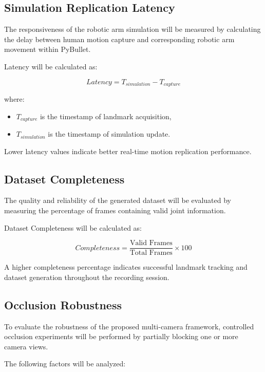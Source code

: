 \subsection{Simulation Replication Latency}

The responsiveness of the robotic arm simulation will be measured by calculating the delay between human motion capture and corresponding robotic arm movement within PyBullet.

Latency will be calculated as:

\begin{equation}
Latency = T_{simulation} - T_{capture}
\end{equation}

where:
\begin{itemize}
    \item $T_{capture}$ is the timestamp of landmark acquisition,
    \item $T_{simulation}$ is the timestamp of simulation update.
\end{itemize}

Lower latency values indicate better real-time motion replication performance.

\subsection{Dataset Completeness}

The quality and reliability of the generated dataset will be evaluated by measuring the percentage of frames containing valid joint information.

Dataset Completeness will be calculated as:

\begin{equation}
Completeness = \frac{\text{Valid Frames}}{\text{Total Frames}} \times 100
\end{equation}

A higher completeness percentage indicates successful landmark tracking and dataset generation throughout the recording session.

\subsection{Occlusion Robustness}

To evaluate the robustness of the proposed multi-camera framework, controlled occlusion experiments will be performed by partially blocking one or more camera views.

The following factors will be analyzed:

